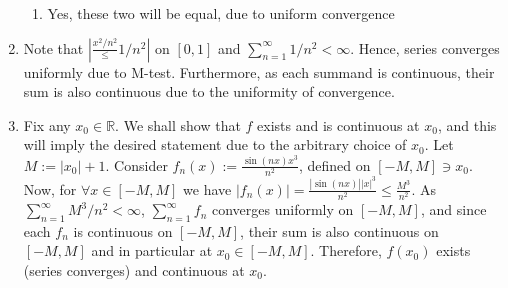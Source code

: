 \documentclass[8pt]{article} %
\newcommand{\myabs}[1]{\left|#1\right|}
\let\oldsum\sum
\renewcommand*{\sum}{\displaystyle\oldsum}
\begin{document}
\begin{enumerate}
{\begin{enumerate}[label=(\alph*)]
{			Now, consider functions $f_n$ given. $f_n'(x)=\frac{(1+x)^n-xn(1+x)^{n-1}}{(1+x)^{2n}}=\frac{1-(n-1)x}{(1+x)^{n+1}}<0$ on $[1,2]$. Hence, 
			$\forall x\in[1,2],\; \myabs{f_n(x)}\leq \myabs{f_n(1)}=1/2^n$. As $\sum\frac{1}{2^n}$ converges, Weierstrass M-test guarantees uniform convergence.
			}
		\item{Yes, these two will be equal, due to uniform convergence}
	\end{enumerate}
	}
\item{Note that $\myabs{\frac{x^2/n^2}\leq 1/n^2}$ on $[0,1]$ and $\sum_{n=1}^\infty 1/n^2<\infty$. Hence, series converges uniformly due to M-test. Furthermore,
	as each summand is continuous, their sum is also continuous due to the uniformity of convergence.
	}
\item{Fix any $x_0\in\mathbb{R}$. We shall show that $f$ exists and
	is continuous at $x_0$, and this will imply the desired statement due to the arbitrary choice of $x_0$. Let
	$M:=\myabs{x_0}+1$. Consider $f_n(x):=\frac{\sin(nx) x^3}{n^2}$, defined on $[-M,M]\ni x_0$. Now, for $\forall x\in[-M,M]$ we have $\myabs{f_n(x)}=
	\frac{\myabs{\sin(nx)} \myabs{x}^3}{n^2}\leq \frac{M^3}{n^2}$. As $\sum_{n=1}^\infty M^3/n^2<\infty$, $\sum_{n=1}^\infty f_n$ converges uniformly on $[-M,M]$,
	and since each $f_n$ is continuous on $[-M,M]$, their sum is also continuous on $[-M,M]$ and in particular at $x_0\in[-M,M]$. Therefore, $f(x_0)$ exists
	(series converges) and continuous at $x_0$.
	}
\end{enumerate}
\end{document}
